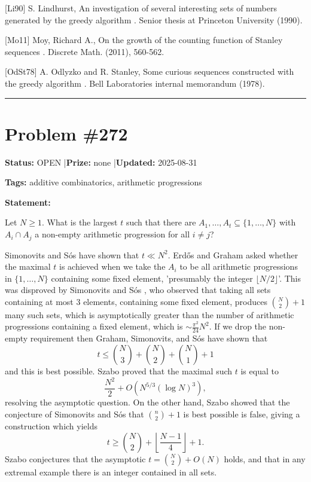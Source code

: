 \documentclass{article}
\begin{document}
[Li90] S. Lindhurst, An investigation of several interesting sets of numbers generated by the greedy algorithm . Senior thesis at Princeton University (1990).

[Mo11] Moy, Richard A., On the growth of the counting function of Stanley sequences . Discrete Math. (2011), 560-562.

[OdSt78] A. Odlyzko and R. Stanley, Some curious sequences constructed with the greedy algorithm . Bell Laboratories internal memorandum (1978).

\noindent\rule{\linewidth}{0.4pt}


\section{Problem \#272}
\label{prob:272}

\noindent\textbf{Status:} OPEN \quad|\quad \textbf{Prize:} none \quad|\quad \textbf{Updated:} 2025-08-31

\noindent\textbf{Tags:} additive combinatorics, arithmetic progressions

\medskip

\noindent\textbf{Statement:}

Let $N\geq 1$. What is the largest $t$ such that there are $A_1,\ldots,A_t\subseteq \{1,\ldots,N\}$ with $A_i\cap A_j$ a non-empty arithmetic progression for all $i\neq j$?




Simonovits and S\'{o}s \cite{SiSo81} have shown that $t\ll N^2$. Erd\H{o}s and Graham asked whether the maximal $t$ is achieved when we take the $A_i$ to be all arithmetic progressions in $\{1,\ldots,N\}$ containing some fixed element, 'presumably the integer $\lfloor N/2\rfloor$'. This was disproved by Simonovits and S\'{o}s \cite{SiSo81}, who observed that taking all sets containing at most $3$ elements, containing some fixed element, produces $\binom{N}{2}+1$ many such sets, which is asymptotically greater than the number of arithmetic progressions containing a fixed element, which is $\sim \frac{\pi^2}{24}N^2$. If we drop the non-empty requirement then Graham, Simonovits, and S\'{o}s \cite{GSS80} have shown that\[t\leq \binom{N}{3}+\binom{N}{2}+\binom{N}{1}+1\]and this is best possible. Szabo \cite{Sz99} proved that the maximal such $t$ is equal to\[\frac{N^2}{2}+O(N^{5/3}(\log N)^3),\]resolving the asymptotic question. On the other hand, Szabo showed that the conjecture of Simonovits and S\'{o}s that $\binom{n}{2}+1$ is best possible is false, giving a construction which yields\[t \geq \binom{N}{2}+\left\lfloor\frac{N-1}{4}\right\rfloor+1.\]Szabo conjectures that the asymptotic $t=\binom{N}{2}+O(N)$ holds, and that in any extremal example there is an integer contained in all sets.
\end{document}

